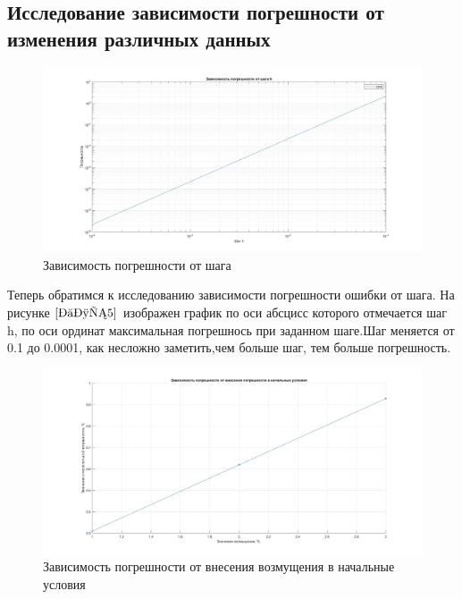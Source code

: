 \documentclass[a4paper]{article}
\begin{document}
\subsection{Исследование зависимости погрешности от изменения различных данных} 

\begin{figure}[h!]
\begin{center}
\includegraphics[scale=0.3]{погрешность от шага.jpg} 
\end{center}
\caption{Зависимость погрешности от шага} \label{Рис5}
\end{figure}
Теперь обратимся к исследованию зависимости погрешности ошибки от шага. На рисунке $\ref{Рис5}$ изображен график по оси абсцисс которого отмечается шаг h, по оси ординат максимальная погрешнось при заданном шаге.Шаг меняется от 0.1 до 0.0001, как несложно заметить,чем больше шаг, тем больше погрешность. 


\begin{figure}[h!]
\begin{center}
\includegraphics[scale=0.3]{возмущение в начальные условия.jpg}  
\end{center}
\caption{Зависимость погрешности от внесения возмущения в начальные условия} \label{Рис6}
\end{figure}
\end{document}

